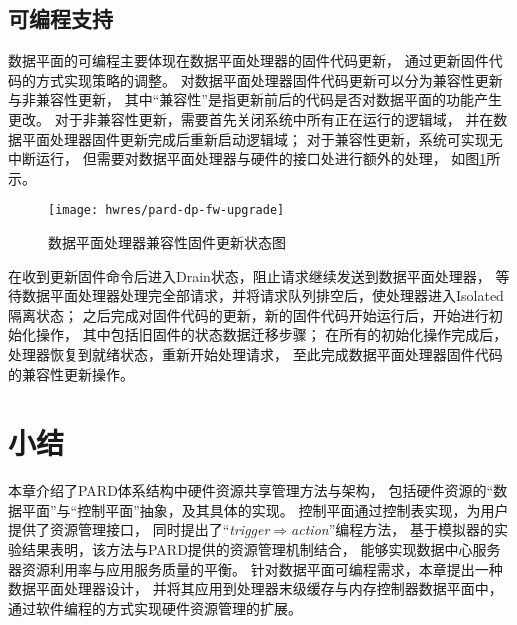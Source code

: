 \subsection{可编程支持}

数据平面的可编程主要体现在数据平面处理器的固件代码更新，
通过更新固件代码的方式实现策略的调整。
对数据平面处理器固件代码更新可以分为兼容性更新与非兼容性更新，
其中``兼容性''是指更新前后的代码是否对数据平面的功能产生更改。
对于非兼容性更新，需要首先关闭系统中所有正在运行的逻辑域，
并在数据平面处理器固件更新完成后重新启动逻辑域；
对于兼容性更新，系统可实现无中断运行，
但需要对数据平面处理器与硬件的接口处进行额外的处理，
如图\ref{fig:pard-dp-fw-upgrade}所示。

\begin{figure}[tb]
  \centering
  \texttt{[image: hwres/pard-dp-fw-upgrade]}
  \caption{数据平面处理器兼容性固件更新状态图}
  \label{fig:pard-dp-fw-upgrade}
\end{figure}

在收到更新固件命令后进入Drain状态，阻止请求继续发送到数据平面处理器，
等待数据平面处理器处理完全部请求，并将请求队列排空后，使处理器进入Isolated隔离状态；
之后完成对固件代码的更新，新的固件代码开始运行后，开始进行初始化操作，
其中包括旧固件的状态数据迁移步骤；
在所有的初始化操作完成后，处理器恢复到就绪状态，重新开始处理请求，
至此完成数据平面处理器固件代码的兼容性更新操作。


\section{小结}

本章介绍了PARD体系结构中硬件资源共享管理方法与架构，
包括硬件资源的``数据平面''与``控制平面''抽象，及其具体的实现。
控制平面通过控制表实现，为用户提供了资源管理接口，
同时提出了``\emph{trigger$\Rightarrow$action}''编程方法，
基于模拟器的实验结果表明，该方法与PARD提供的资源管理机制结合，
能够实现数据中心服务器资源利用率与应用服务质量的平衡。
针对数据平面可编程需求，本章提出一种数据平面处理器设计，
并将其应用到处理器末级缓存与内存控制器数据平面中，
通过软件编程的方式实现硬件资源管理的扩展。

